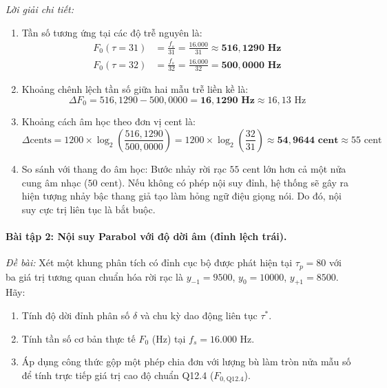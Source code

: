 \emph{Lời giải chi tiết:}
\begin{enumerate}[leftmargin=1.5em, itemsep=2pt]
    \item Tần số tương ứng tại các độ trễ nguyên là:
    \begin{align}
    F_0(\tau = 31) &= \frac{f_s}{31} = \frac{16.000}{31} \approx \mathbf{516{,}1290\text{ Hz}} \\
    F_0(\tau = 32) &= \frac{f_s}{32} = \frac{16.000}{32} = \mathbf{500{,}0000\text{ Hz}}
    \end{align}
    \item Khoảng chênh lệch tần số giữa hai mẫu trễ liền kề là:
    \begin{equation}
    \Delta F_0 = 516{,}1290 - 500{,}0000 = \mathbf{16{,}1290\text{ Hz}} \approx 16{,}13\text{ Hz}
    \end{equation}
    \item Khoảng cách âm học theo đơn vị cent là:
    \begin{equation}
    \Delta \text{cents} = 1200 \times \log_2\left( \frac{516{,}1290}{500{,}0000} \right) = 1200 \times \log_2\left( \frac{32}{31} \right) \approx \mathbf{54{,}9644\text{ cent}} \approx 55\text{ cent}
    \end{equation}
    \item So sánh với thang đo âm học: Bước nhảy rời rạc $55\text{ cent}$ lớn hơn cả một nửa cung âm nhạc ($50\text{ cent}$). Nếu không có phép nội suy đỉnh, hệ thống sẽ gây ra hiện tượng nhảy bậc thang giả tạo làm hỏng ngữ điệu giọng nói. Do đó, nội suy cực trị liên tục là bắt buộc.
\end{enumerate}

\paragraph{Bài tập 2: Nội suy Parabol với độ dời âm (đỉnh lệch trái).}
\emph{Đề bài:} Xét một khung phân tích có đỉnh cục bộ được phát hiện tại $\tau_p = 80$ với ba giá trị tương quan chuẩn hóa rời rạc là $y_{-1} = 9500$, $y_0 = 10000$, $y_{+1} = 8500$. Hãy:
\begin{enumerate}[label=(\alph*), leftmargin=1.5em, itemsep=2pt]
    \item Tính độ dời đỉnh phân số $\delta$ và chu kỳ dao động liên tục $\tau^*$.
    \item Tính tần số cơ bản thực tế $F_0$ (Hz) tại $f_s = 16.000\text{ Hz}$.
    \item Áp dụng công thức gộp một phép chia đơn với lượng bù làm tròn nửa mẫu số để tính trực tiếp giá trị cao độ chuẩn Q12.4 ($F_{0, \text{Q12.4}}$).
\end{enumerate}

